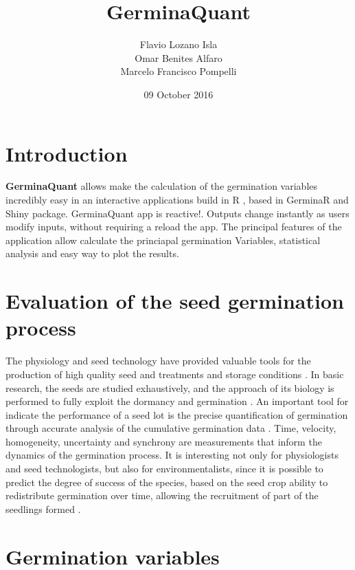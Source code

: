 \documentclass[]{book}
\title{GerminaQuant}
\author{Flavio Lozano Isla \\ Omar Benites Alfaro \\ Marcelo Francisco Pompelli}
\date{09 October 2016}
\begin{document}
\maketitle

{
\setcounter{tocdepth}{1}
\tableofcontents
}
\chapter*{Introduction}\label{introduction}

\textbf{GerminaQuant} allows make the calculation of the germination
variables incredibly easy in an interactive applications build in R
\citep{R-base}, based in GerminaR and Shiny \citep{R-shiny} package.
GerminaQuant app is reactive!. Outputs change instantly as users modify
inputs, without requiring a reload the app. The principal features of
the application allow calculate the princiapal germination Variables,
statistical analysis and easy way to plot the results.

\chapter{Evaluation of the seed germination
process}\label{evaluation-of-the-seed-germination-process}

The physiology and seed technology have provided valuable tools for the
production of high quality seed and treatments and storage conditions
\citep{Marcos-Filho1998}. In basic research, the seeds are studied
exhaustively, and the approach of its biology is performed to fully
exploit the dormancy and germination \citep{Penfield2009}. An important
tool for indicate the performance of a seed lot is the precise
quantification of germination through accurate analysis of the
cumulative germination data \citep{Joosen2010}. Time, velocity,
homogeneity, uncertainty and synchrony are measurements that inform the
dynamics of the germination process. It is interesting not only for
physiologists and seed technologists, but also for environmentalists,
since it is possible to predict the degree of success of the species,
based on the seed crop ability to redistribute germination over time,
allowing the recruitment of part of the seedlings formed
\citep{Ranal2006}.

\chapter{Germination variables}\label{germination-variables}
\end{document}
